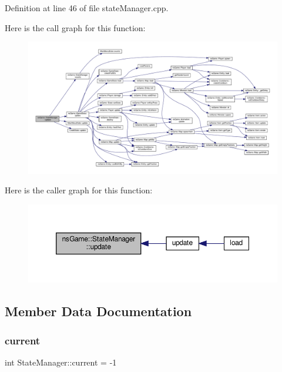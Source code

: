 Definition at line 46 of file state\+Manager.\+cpp.

Here is the call graph for this function\+:\nopagebreak
\begin{figure}[H]
\begin{center}
\leavevmode
\includegraphics[width=350pt]{classns_game_1_1_state_manager_ab9c5e47745b79af657c08adcc8607475_cgraph}
\end{center}
\end{figure}
Here is the caller graph for this function\+:\nopagebreak
\begin{figure}[H]
\begin{center}
\leavevmode
\includegraphics[width=350pt]{classns_game_1_1_state_manager_ab9c5e47745b79af657c08adcc8607475_icgraph}
\end{center}
\end{figure}


\subsection{Member Data Documentation}
\mbox{\label{classns_game_1_1_state_manager_a434bcd70e388fe52aa9bef8e0e4175cd}} 
\subsubsection{\texorpdfstring{current}{current}}
{\footnotesize\ttfamily int State\+Manager\+::current = -\/1\hspace{0.3cm}{\ttfamily [static]}}



